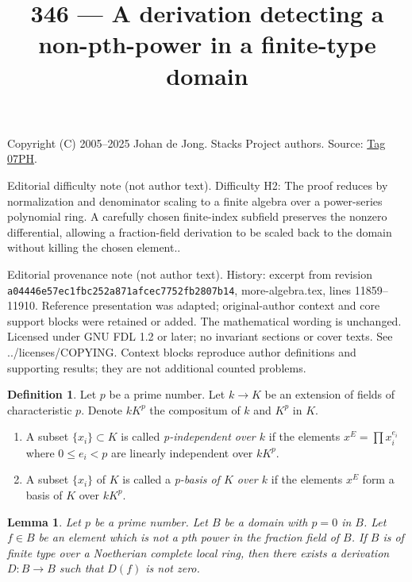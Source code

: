 \documentclass{amsart}
\theoremstyle{plain}
\newtheorem{lemma}[subsection]{Lemma}
\theoremstyle{definition}
\newtheorem{definition}[subsection]{Definition}
\theoremstyle{remark}
\numberwithin{equation}{subsection}
\begin{document}
\title[Stacks Project, Tag 07PH]{346 --- A derivation detecting a non-pth-power in a finite-type domain}
\maketitle
\noindent Copyright (C) 2005--2025 Johan de Jong. Stacks Project authors. Source: \href{https://stacks.math.columbia.edu/tag/07PH}{Tag 07PH}.

\noindent Editorial difficulty note (not author text). Difficulty H2: The proof reduces by normalization and denominator scaling to a finite algebra over a power-series polynomial ring. A carefully chosen finite-index subfield preserves the nonzero differential, allowing a fraction-field derivation to be scaled back to the domain without killing the chosen element..

\noindent Editorial provenance note (not author text). History: excerpt from revision \texttt{a0444\allowbreak 6e57e\allowbreak c1fbc\allowbreak 252a8\allowbreak 71afc\allowbreak ec775\allowbreak 2fb28\allowbreak 07b14}, more-algebra.tex, lines 11859--11910. Reference presentation was adapted; original-author context and core support blocks were retained or added. The mathematical wording is unchanged. Licensed under GNU FDL 1.2 or later; no invariant sections or cover texts. See ../licenses/COPYING. Context blocks reproduce author definitions and supporting results; they are not additional counted problems.

\begin{definition}
\label{definition-p-basis}
Let $p$ be a prime number. Let $k \to K$ be an extension of fields
of characteristic $p$. Denote $kK^p$ the compositum of $k$ and $K^p$
in $K$.
\begin{enumerate}
\item A subset $\{x_i\} \subset K$ is called {\it p-independent
over $k$} if the elements $x^E = \prod x_i^{e_i}$ where
$0 \leq e_i < p$ are linearly independent over $kK^p$.
\item A subset $\{x_i\}$ of $K$ is called a
{\it p-basis of $K$ over $k$} if the elements
$x^E$ form a basis of $K$ over $kK^p$.
\end{enumerate}
\end{definition}

\begin{lemma}
\label{lemma-find-D}
Let $p$ be a prime number. Let $B$ be a domain with $p = 0$ in $B$.
Let $f \in B$ be an element which is not a $p$th power in the fraction
field of $B$. If $B$ is of finite type over a Noetherian complete
local ring, then there exists a derivation $D : B \to B$ such that $D(f)$
is not zero.
\end{lemma}
\end{document}
